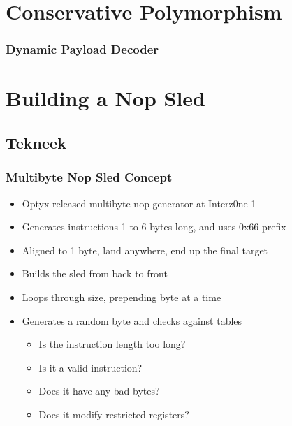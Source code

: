 \documentclass{beamer}
\newenvironment{sitemize}{\vspace{1mm}\begin{itemize}\itemsep 4pt\small}{\end{itemize}}
\begin{document}
\section{Conservative Polymorphism}

\newcommand{\incshi}[1]{\texttt{[image: \#1]}}

\begin{frame}[t]
  \frametitle{Dynamic Payload Decoder}
  \only<9>{\incshi{shi8}}
  \only<8>{\incshi{shi7}}
  \only<7>{\incshi{shi6}}
  \only<6>{\incshi{shi5}}
  \only<5>{\incshi{shi4}}
  \only<4>{\incshi{shi3}}
  \only<3>{\incshi{shi2}}
  \only<2>{\incshi{shi1}}
  \only<1>{\incshi{shi0}}
\end{frame}

\section{Building a Nop Sled}

\subsection{Tekneek}

\begin{frame}[t]
  \frametitle{Multibyte Nop Sled Concept}
  \begin{sitemize}
    \item Optyx released multibyte nop generator at Interz0ne 1
    \item Generates instructions 1 to 6 bytes long, and uses 0x66 prefix
    \item Aligned to 1 byte, land anywhere, end up the final target
  \end{sitemize}
  \begin{sitemize}
    \pause
    \item Builds the sled from back to front
    \item Loops through size, prepending byte at a time
    \item Generates a random byte and checks against tables
    \pause
    \begin{sitemize}
      \item Is the instruction length too long?
      \item Is it a valid instruction?
      \item Does it have any bad bytes?
      \item Does it modify restricted registers?
    \end{sitemize}
  \end{sitemize}
\end{frame}
\end{document}
